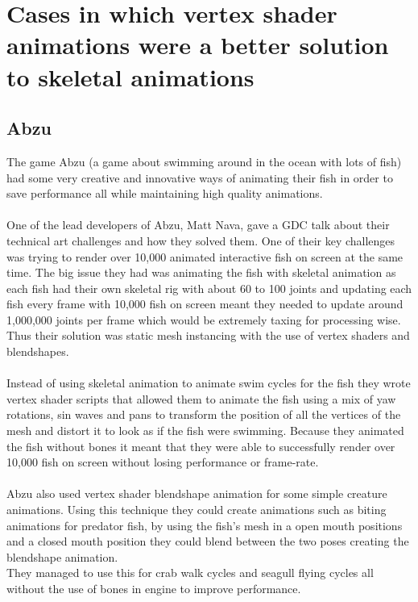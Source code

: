 \documentclass{scrartcl}
\begin{document}
\section{Cases in which vertex shader animations were a better solution to skeletal animations}

\subsection{Abzu}
The game Abzu (a game about swimming around in the ocean with lots of fish) had some very creative and innovative ways of animating their fish in order to save performance all while maintaining high quality animations.
\\~\\
One of the lead developers of Abzu, Matt Nava, gave a GDC talk about their technical art challenges and how they solved them.\cite{seven} One of their key challenges was trying to render over 10,000 animated interactive fish on screen at the same time. The big issue they had was animating the fish with skeletal animation as each fish had their own skeletal rig with about 60 to 100 joints and updating each fish every frame with 10,000 fish on screen meant they needed to update around 1,000,000 joints per frame which would be extremely taxing for processing wise. Thus their solution was static mesh instancing with the use of vertex shaders and blendshapes.
\\~\\
Instead of using skeletal animation to animate swim cycles for the fish they wrote vertex shader scripts that allowed them to animate the fish using a mix of yaw rotations, sin waves and pans to transform the position of all the vertices of the mesh and distort it to look as if the fish were swimming. Because they animated the fish without bones it meant that they were able to successfully render over 10,000 fish on screen without losing performance or frame-rate.
\\~\\
Abzu also used vertex shader blendshape animation for some simple creature animations. Using this technique they could create animations such as biting animations for predator fish, by using the fish's mesh in a open mouth positions and a closed mouth position they could blend between the two poses creating the blendshape animation.\\
They managed to use this for crab walk cycles and seagull flying cycles all without the use of bones in engine to improve performance.
\end{document}
